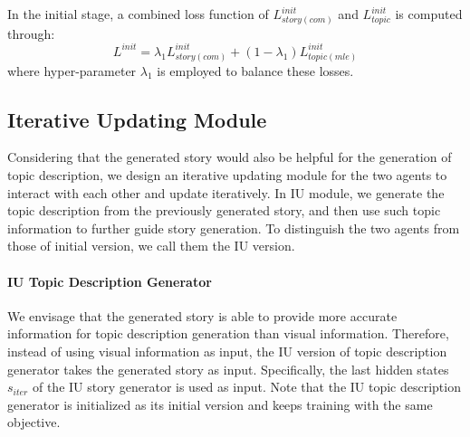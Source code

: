 \documentclass[11pt]{article}
\begin{document}
In the initial stage, a combined loss function of $L^{init}_{story(com)}$ and $L^{init}_{topic}$ is computed through:
{
\begin{equation}
\label{init}
L^{init} = \lambda_1 L^{init}_{story(com)}+(1-\lambda_1)L^{init}_{topic(mle)}
\end{equation}
}where hyper-parameter $\lambda_1$ is employed to balance these losses.

\subsection{Iterative Updating Module}
\label{iu_module}

Considering that the generated story would also be helpful for the generation of topic description, we design an iterative updating module for the two agents to interact with each other and update iteratively. In IU module, we generate the topic description from the previously generated story, and then use such topic information to further guide story generation. To distinguish the two agents from those of initial version, we call them the IU version.

\paragraph{IU Topic Description Generator}
We envisage that the generated story is able to provide more accurate information for topic description generation than visual information. Therefore, instead of using visual information as input, the IU version of topic description generator takes the generated story as input. Specifically, the last hidden states $s_{iter}$ of the IU story generator is used as input. Note that the IU topic description generator is initialized as its initial version and keeps training with the same objective. 



\begin{comment}
Note that the IU topic extractor is the same as mentioned in previous. Similarly, the topic extractor produces topic hidden states $h^t=[h^t_1,...,h^t_M]$( $M > 1$) sequently as the topic vectors, and also produces a probability distribution $p^{iter}_{topic}$ over the whole topic vocabulary $\mathbb{V}_t$. The training loss of IU topic extractor is the cross-entropy loss $L^{iter}_{topic}$ between the generated topic distribution $p^{iter}_{topic}$ and the ground-truth topic distribution $p_{topic}$.
\end{comment}
\end{document}
